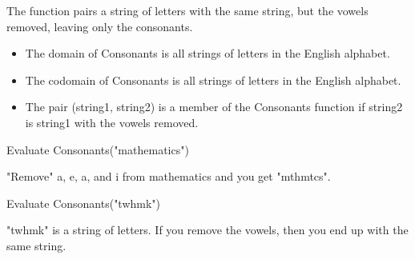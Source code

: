 \documentclass{ximera}
\begin{document}
\begin{definition}
  The function  pairs a string of letters with the same string, but the vowels removed, leaving only the consonants.
 
    \begin{itemize}
    \item The domain of Consonants is all strings of letters in the English alphabet.
    \item The codomain of Consonants is all strings of letters in the English alphabet.
    \item The pair (string1, string2) is a member of the Consonants function if string2 is string1 with the vowels removed.
    \end{itemize}

  
\end{definition}



\begin{exercise}

 Evaluate Consonants("mathematics")

  \begin{multipleChoice}
  \end{multipleChoice}
  \begin{feedback}
"Remove" a, e, a, and i from mathematics and you get "mthmtcs".
  \end{feedback}
\end{exercise}



\begin{exercise}

 Evaluate Consonants("twhmk")

  \begin{multipleChoice}
  \end{multipleChoice}
  \begin{feedback}
"twhmk" is a string of letters. If you remove the vowels, then you end up with the same string.
  \end{feedback}
\end{exercise}
\end{document}
